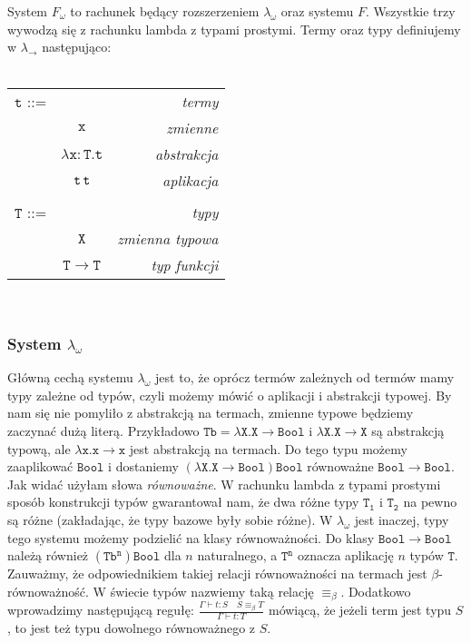 \documentclass[11pt,leqno]{article}
\begin{document}
System $F_{\omega}$ to rachunek będący rozszerzeniem $\lambda_{\omega}$ oraz systemu $F$.
Wszystkie trzy wywodzą się z rachunku lambda z typami prostymi. Termy oraz typy definiujemy w $\lambda_{\rightarrow}$ następująco: \\ \\
\begin{tabular}{| l c r |}
  \hline
  $\mathtt{t}$ ::= &  & \textit{termy}  \\
   & $\mathtt{x}$ & \textit{zmienne}  \\
   & $\mathtt{\lambda x:T.t}$ & \textit{abstrakcja} \\
   & $\mathtt{t \hspace{0.2em} t}$ & \textit{aplikacja} \\
   & & \\
  $\mathtt{T}$ ::= &  & \textit{typy} \\
   & $\mathtt{X}$ & \textit{zmienna typowa} \\
   & $\mathtt{T \rightarrow T}$ & \textit{typ funkcji} \\
  \hline
\end{tabular} \\



\subsubsection{System $\lambda_{\omega}$} 

Główną cechą systemu $\lambda_{\omega}$ jest to, że oprócz termów zależnych od termów mamy typy zależne od typów, czyli możemy mówić o aplikacji i abstrakcji typowej. By nam się nie pomyliło z abstrakcją na termach, zmienne typowe będziemy zaczynać dużą literą. Przykładowo $\mathtt{Tb=\lambda X.X \rightarrow Bool}$ i $\mathtt{\lambda X.X \rightarrow X}$ są abstrakcją typową, ale $\mathtt{\lambda x.x \rightarrow x}$ jest abstrakcją na termach. 
Do tego typu możemy zaaplikować $\mathtt{Bool}$ i dostaniemy $\mathtt{(\lambda X.X \rightarrow Bool)Bool}$ równoważne $\mathtt{Bool \rightarrow Bool}$. Jak widać użyłam słowa \textit{równoważne}. W rachunku lambda z typami prostymi sposób konstrukcji typów gwarantował nam, że dwa różne typy $\mathtt{T_1}$ i $\mathtt{T_2}$ na pewno są różne (zakładając, że typy bazowe były sobie różne). W $\lambda_{\omega}$ jest inaczej, typy tego systemu możemy podzielić na klasy równoważności. Do klasy $\mathtt{Bool \rightarrow Bool}$ należą również $\mathtt{ (Tb^n) Bool }$ dla $n$ naturalnego, a $\mathtt{T^n}$ oznacza aplikację $n$ typów $\mathtt{T}$.
Zauważmy, że odpowiednikiem takiej relacji równoważności na termach jest $\beta$-równoważność. W świecie typów nazwiemy taką relację $\equiv_{\beta}$.
Dodatkowo wprowadzimy następującą regułę:
$\frac{\Gamma \vdash t:S \hspace{1em} S\equiv_{\beta}T  }{\Gamma \vdash t:T}$
mówiącą, że jeżeli term jest typu $S$, to jest też typu dowolnego równoważnego z $S$.  
\end{document}
